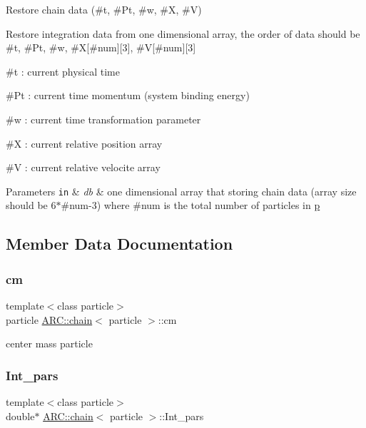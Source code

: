Restore chain data (\#t, \#\+Pt, \#w, \#X, \#V) 

Restore integration data from one dimensional array, the order of data should be \#t, \#\+Pt, \#w, \#X\mbox{[}\#num\mbox{]}\mbox{[}3\mbox{]}, \#V\mbox{[}\#num\mbox{]}\mbox{[}3\mbox{]}
\begin{DoxyItemize}
\item \#t \+: current physical time
\item \#\+Pt \+: current time momentum (system binding energy)
\item \#w \+: current time transformation parameter
\item \#X \+: current relative position array
\item \#V \+: current relative velocite array 
\begin{DoxyParams}[1]{Parameters}
\mbox{\tt in}  & {\em db} & one dimensional array that storing chain data (array size should be 6$\ast$\#num-\/3) where \#num is the total number of particles in \hyperlink{classARC_1_1chain_af1793b656e139e1f87c2e0a55f87514b}{p} \\
\hline
\end{DoxyParams}

\end{DoxyItemize}

\subsection{Member Data Documentation}
\hypertarget{classARC_1_1chain_ae9f6a5cbf7aac2b33c7274e7e10916ed}{}\label{classARC_1_1chain_ae9f6a5cbf7aac2b33c7274e7e10916ed} 
\subsubsection{\texorpdfstring{cm}{cm}}
{\footnotesize\ttfamily template$<$class particle$>$ \\
particle \hyperlink{classARC_1_1chain}{A\+R\+C\+::chain}$<$ particle $>$\+::cm}



center mass particle 

\hypertarget{classARC_1_1chain_ada3f98172a98cdf9a64abacfe95f9cd8}{}\label{classARC_1_1chain_ada3f98172a98cdf9a64abacfe95f9cd8} 
\subsubsection{\texorpdfstring{Int\+\_\+pars}{Int\_pars}}
{\footnotesize\ttfamily template$<$class particle$>$ \\
double$\ast$ \hyperlink{classARC_1_1chain}{A\+R\+C\+::chain}$<$ particle $>$\+::Int\+\_\+pars}



